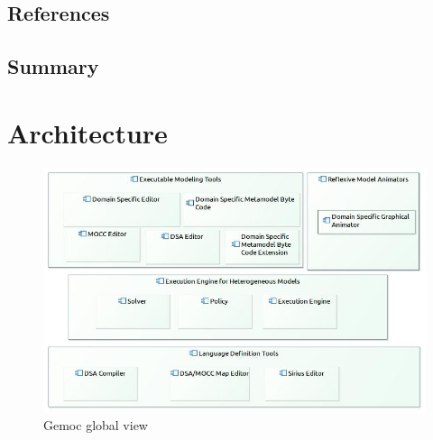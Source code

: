 \documentclass{gemoc} %
\begin{document}
\section{References}


\section{Summary}

 
\chapter{Architecture}
\begin{figure}[bt]
	\begin{center}
	\includegraphics*[trim=0.0cm 0.0cm 0cm 0.0cm, clip=true, width=1.0\linewidth]{../images/GlobalView.jpg}
	\caption{Gemoc global view}
	\label{fig:ComponentList}
	\end{center}
\end{figure}
\end{document}
